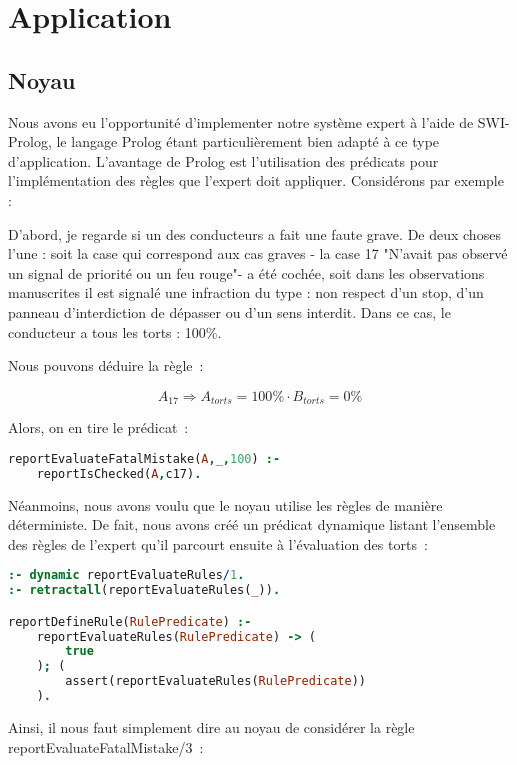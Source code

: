 \chapter{Application}

\section{Noyau}

Nous avons eu l'opportunité d'implementer notre système expert à l'aide de SWI-Prolog, le langage Prolog étant particulièrement bien adapté à ce type d'application.
L'avantage de Prolog est l'utilisation des prédicats pour l'implémentation des règles que l'expert doit appliquer. Considérons par exemple :

D'abord, je regarde si un des conducteurs a fait une faute grave. De deux choses l'une : soit la case qui correspond aux cas graves - la case
17 "N'avait pas observé un signal de priorité ou un feu rouge"- a été cochée, soit dans les observations manuscrites il est signalé une
infraction du type : non respect d'un stop, d'un panneau d'interdiction de dépasser ou d'un sens interdit. Dans ce cas, le conducteur a tous
les torts : 100\%.

Nous pouvons déduire la règle~:

\[A_{17} \Rightarrow A_{torts} = 100\% \cdot B_{torts} = 0\%\]

Alors, on en tire le prédicat~:

\begin{lstlisting}[language=Prolog,frame=single]
reportEvaluateFatalMistake(A,_,100) :-
    reportIsChecked(A,c17).
\end{lstlisting}

Néanmoins, nous avons voulu que le noyau utilise les règles de manière déterministe. De fait, nous avons créé un prédicat dynamique listant l'ensemble
des règles de l'expert qu'il parcourt ensuite à l'évaluation des torts~:

\begin{lstlisting}[language=Prolog,frame=single]
:- dynamic reportEvaluateRules/1.
:- retractall(reportEvaluateRules(_)).

reportDefineRule(RulePredicate) :-
    reportEvaluateRules(RulePredicate) -> (
        true
    ); (
        assert(reportEvaluateRules(RulePredicate))
    ).
\end{lstlisting}

Ainsi, il nous faut simplement dire au noyau de considérer la règle reportEvaluateFatalMistake/3~:

